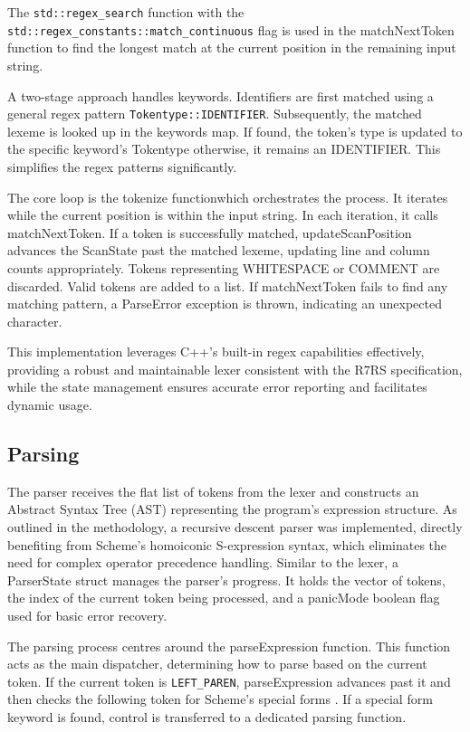 \documentclass[final]{cmpreport_02}
\begin{document}
The \texttt{std::regex\_search} function with the \newline \texttt{std::regex\_constants::match\_continuous} flag is used in the matchNextToken function to find the longest match at the current position in the remaining input string. 

A two-stage approach handles keywords. Identifiers are first matched using a general regex pattern \texttt{Tokentype::IDENTIFIER}. Subsequently, the matched lexeme is looked up in the keywords map. If found, the token's type is updated to the specific keyword's Tokentype otherwise, it remains an IDENTIFIER. This simplifies the regex patterns significantly.

The core loop is the tokenize functionwhich orchestrates the process. It iterates while the current position is within the input string. In each iteration, it calls matchNextToken. If a token is successfully matched, updateScanPosition advances the ScanState past the matched lexeme, updating line and column counts appropriately. Tokens representing WHITESPACE or COMMENT are discarded. Valid tokens are added to a list. If matchNextToken fails to find any matching pattern, a ParseError exception is thrown, indicating an unexpected character. 

This implementation leverages C++'s built-in regex capabilities effectively, providing a robust and maintainable lexer consistent with the R7RS specification, while the state management ensures accurate error reporting and facilitates dynamic usage.


\subsection{Parsing}
The parser receives the flat list of tokens from the lexer and constructs an Abstract Syntax Tree (AST) representing the program's expression structure. As outlined in the methodology, a recursive descent parser was implemented, directly benefiting from Scheme's homoiconic S-expression syntax, which eliminates the need for complex operator precedence handling. Similar to the lexer, a ParserState struct manages the parser's progress. It holds the vector of tokens, the index of the current token being processed, and a panicMode boolean flag used for basic error recovery.

The parsing process centres around the parseExpression function. This function acts as the main dispatcher, determining how to parse based on the current token. If the current token is \texttt{LEFT\_PAREN}, parseExpression advances past it and then checks the following token for Scheme's special forms \cite{r7rs}. If a special form keyword is found, control is transferred to a dedicated parsing function.
\end{document}
